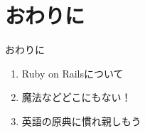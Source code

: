 \documentclass[t, aspectratio=169]{beamer}
\begin{document}
\section{おわりに}
\label{sec-8-3}
\begin{frame}[label=sec-8-3-1]{おわりに}
\begin{enumerate}
\item Ruby on Railsについて
\item 魔法などどこにもない！
\item 英語の原典に慣れ親しもう
\end{enumerate}
\end{frame}
\end{document}
